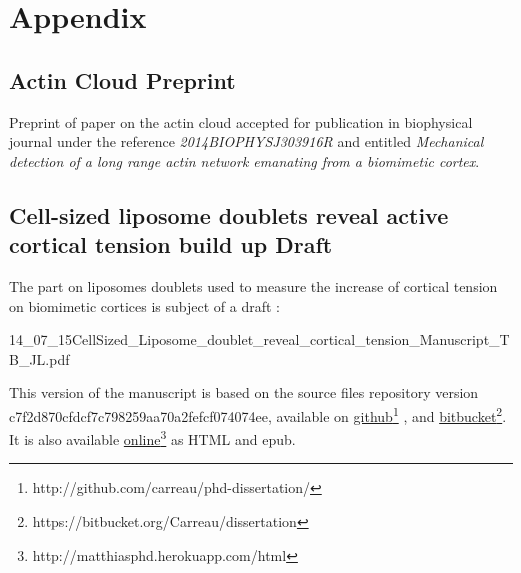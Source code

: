 \documentclass[A4paperpaper,11pt,english]{sphinxmanual}
\begin{document}
\chapter{Appendix}
\label{index-latex:appendix}\label{index-latex::doc}

\section{Actin Cloud Preprint}
\label{index-latex:actin-cloud-preprint}
Preprint of paper on the actin cloud accepted for publication in biophysical
journal under the reference \emph{2014BIOPHYSJ303916R} and entitled \emph{Mechanical
detection of a long range actin network emanating from a biomimetic cortex}.



\section{Cell-sized liposome doublets reveal active cortical tension build up Draft}
\label{index-latex:cell-sized-liposome-doublets-reveal-active-cortical-tension-build-up-draft}
The part on liposomes doublets used to measure the increase of cortical tension
on biomimetic cortices is subject of a draft :

{14_07_15CellSized_Liposome_doublet_reveal_cortical_tension_Manuscript_TB_JL.pdf}


This version of the manuscript is based on the source files repository version
c7f2d870cfdcf7c798259aa70a2fefcf074074ee, available on \href{http://github.com/carreau/phd-dissertation/}{github}\footnote{http://github.com/carreau/phd-dissertation/}
, and \href{https://bitbucket.org/Carreau/dissertation}{bitbucket}\footnote{https://bitbucket.org/Carreau/dissertation}. It is also available \href{http://matthiasphd.herokuapp.com/html}{online}\footnote{http://matthiasphd.herokuapp.com/html} as HTML and epub.
\end{document}
